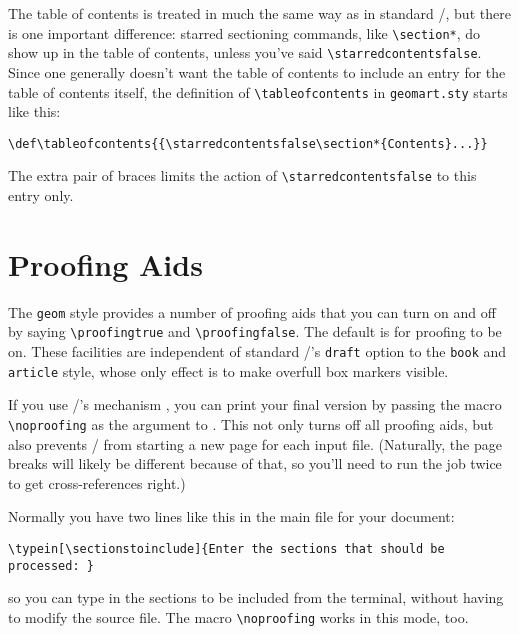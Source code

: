 The table of contents is treated in much the same way as in standard
\latex/, but there is one important difference: starred sectioning
commands, like \verb+\section*+, do show up in the table of contents,
unless you've said \verb+\starredcontentsfalse+.  
Since one generally doesn't want the table of contents
to include an entry for the table of contents itself,
the definition of \verb+\tableofcontents+ in 
\verb+geomart.sty+ starts like this:
\begin{verbatim}
\def\tableofcontents{{\starredcontentsfalse\section*{Contents}...}}
\end{verbatim}
The extra pair of braces limits the action of
\verb+\starredcontentsfalse+ to this entry only.

\section{Proofing Aids}

The \verb+geom+ style provides a number of proofing aids that you can
turn on and off by saying \verb+\proofingtrue+ and
\verb+\proofingfalse+.  The default is for proofing to be on.  These
facilities are independent of standard \latex/'s \verb+draft+ option
to the \verb+book+ and \verb+article+ style, whose only effect is to
make overfull box markers visible.

If you use \latex/'s \verb++ mechanism \cite[76]{Lamport},
you can print your final version by passing the macro
\verb+\noproofing+ as the argument to \verb++.  This not
only turns off all proofing aids, but also prevents \latex/ from
starting a new page for each input file.  (Naturally, the page breaks
will likely be different because of that, so you'll need to run the
job twice to get cross-references right.)

\begin{wizard}
Normally you have two lines like this in the main file for your
document:
\begin{verbatim}
\typein[\sectionstoinclude]{Enter the sections that should be processed: }

\end{verbatim}
so you can type in the sections to be included from the terminal,
without having to modify the source file.  The macro
\verb+\noproofing+ works in this mode, too.
\end{wizard}

